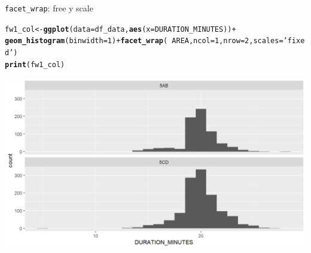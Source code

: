 \documentclass{beamer}\usepackage[]{graphicx}\usepackage[]{color}
\makeatletter
\newcommand{\hlnum}[1]{\textcolor[rgb]{0.686,0.059,0.569}{#1}}%
\newcommand{\hlstr}[1]{\textcolor[rgb]{0.192,0.494,0.8}{#1}}%
\newcommand{\hlopt}[1]{\textcolor[rgb]{0,0,0}{#1}}%
\newcommand{\hlstd}[1]{\textcolor[rgb]{0.345,0.345,0.345}{#1}}%
\newcommand{\hlkwb}[1]{\textcolor[rgb]{0.69,0.353,0.396}{#1}}%
\newcommand{\hlkwc}[1]{\textcolor[rgb]{0.333,0.667,0.333}{#1}}%
\newcommand{\hlkwd}[1]{\textcolor[rgb]{0.737,0.353,0.396}{\textbf{#1}}}%
\newenvironment{kframe}{%
 \def\at@end@of@kframe{}%
 \ifinner\ifhmode%
  \def\at@end@of@kframe{\end{minipage}}%
  \begin{minipage}{\columnwidth}%
 \fi\fi%
 \def\FrameCommand##1{\hskip\@totalleftmargin \hskip-\fboxsep
 \colorbox{shadecolor}{##1}\hskip-\fboxsep
     \hskip-\linewidth \hskip-\@totalleftmargin \hskip\columnwidth}%
 \MakeFramed {\advance\hsize-\width
   \@totalleftmargin\z@ \linewidth\hsize
   \@setminipage}}%
 {\par\unskip\endMakeFramed%
 \at@end@of@kframe}
\newenvironment{knitrout}{}{} %
\makeatother
\begin{document}
\begin{frame}[fragile]{\lstinline{facet_wrap}: free y scale}
\begin{knitrout}\footnotesize
{}\color{fgcolor}\begin{kframe}
\begin{alltt}
\hlstd{fw1_col} \hlkwb{<-} \hlkwd{ggplot}\hlstd{(}\hlkwc{data}\hlstd{=df_data,} \hlkwd{aes}\hlstd{(}\hlkwc{x}\hlstd{=DURATION_MINUTES))} \hlopt{+}
  \hlkwd{geom_histogram}\hlstd{(}\hlkwc{binwidth}\hlstd{=}\hlnum{1}\hlstd{)} \hlopt{+} \hlkwd{facet_wrap}\hlstd{(}\hlopt{~} \hlstd{AREA,} \hlkwc{ncol} \hlstd{=} \hlnum{1}\hlstd{,} \hlkwc{nrow} \hlstd{=} \hlnum{2}\hlstd{,} \hlkwc{scales} \hlstd{=} \hlstr{'fixed'}\hlstd{)}
\hlkwd{print}\hlstd{(fw1_col)}
\end{alltt}
\end{kframe}

{\centering \includegraphics[width=.9\linewidth]{figure/facet_wrap_4-1} 

}



\end{knitrout}
\end{frame}
\end{document}

